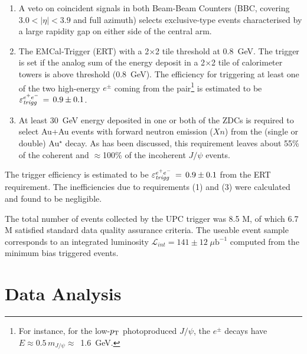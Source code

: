 \documentclass[dvipdfm]{elsart}
\providecommand{\jpsi}{J/\psi}
\begin{document}
\begin{enumerate}

\item A veto on coincident signals in both Beam-Beam Counters (BBC, covering 
$3.0<|\eta|<3.9$ and full azimuth) selects exclusive-type events 
characterised by a large rapidity gap on either side of the central arm.

\item The EMCal-Trigger (ERT) with a 2$\times$2 tile threshold at 0.8~GeV. 
The trigger is set if the analog sum of the energy deposit in a 2$\times$2 
tile of calorimeter towers is above threshold (0.8~GeV).  The efficiency for 
triggering at least one of the two high-energy $e^\pm$ coming from the 
pair\footnote{ For instance, for the low-$p_{\rm T}$ photoproduced $\jpsi$, the 
$e^\pm$ decays have $E\approx 0.5\,m_{\jpsi}\approx$~1.6~GeV. } is estimated 
to be $\varepsilon_{\ensuremath{\it trigg}}^{e^+ e^-} \,=\, 0.9 \pm 0.1$.

\item At least 30~GeV energy deposited in one or both of the ZDCs is required 
to select Au+Au events with forward neutron emission ($Xn$) from the (single 
or double) Au$^\star$ decay. As has been discussed, this requirement leaves 
about 55\% of the coherent and $\approx$100\% of the incoherent $\jpsi$ 
events.

\end{enumerate}

The trigger efficiency is estimated to be $\varepsilon_{\ensuremath{\it 
trigg}}^{e^+ e^-} \,=\, 0.9 \pm 0.1$ from the ERT requirement. The 
inefficiencies due to requirements (1) and (3) were calculated and found to 
be negligible.

The total number of events collected by the UPC trigger was 8.5 M, of which 
6.7 M satisfied standard data quality assurance criteria. The useable event 
sample corresponds to an integrated luminosity $ {\mathcal L}_{int} = 141 \pm 
12 \;\mu\mbox{b}^{-1}$ computed from the minimum bias triggered events.

\section{Data Analysis}
\label{section:analysis}
\end{document}
